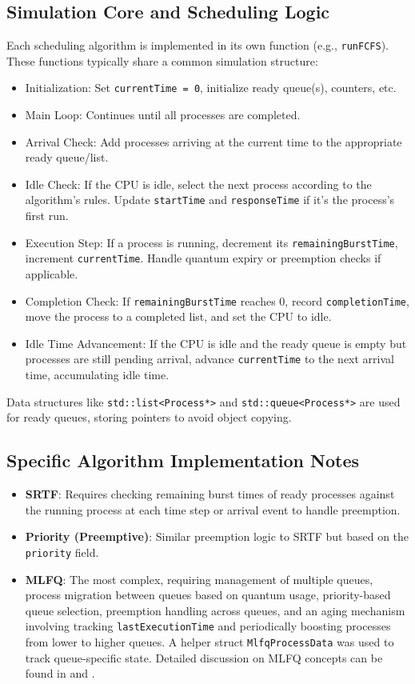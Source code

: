 \documentclass[12pt]{article}
\begin{document}
\subsection{Simulation Core and Scheduling Logic}
Each scheduling algorithm is implemented in its own function (e.g., \texttt{runFCFS}). These functions typically share a common simulation structure:
\begin{itemize}
    \item Initialization: Set \texttt{currentTime = 0}, initialize ready queue(s), counters, etc.
    \item Main Loop: Continues until all processes are completed.
    \item Arrival Check: Add processes arriving at the current time to the appropriate ready queue/list.
    \item Idle Check: If the CPU is idle, select the next process according to the algorithm's rules. Update \texttt{startTime} and \texttt{responseTime} if it's the process's first run.
    \item Execution Step: If a process is running, decrement its \texttt{remainingBurstTime}, increment \texttt{currentTime}. Handle quantum expiry or preemption checks if applicable.
    \item Completion Check: If \texttt{remainingBurstTime} reaches 0, record \texttt{completionTime}, move the process to a completed list, and set the CPU to idle.
    \item Idle Time Advancement: If the CPU is idle and the ready queue is empty but processes are still pending arrival, advance \texttt{currentTime} to the next arrival time, accumulating idle time.
\end{itemize}
Data structures like \texttt{std::list<Process*>} and \texttt{std::queue<Process*>} are used for ready queues, storing pointers to avoid object copying.

\subsection{Specific Algorithm Implementation Notes}
\begin{itemize}
    \item \textbf{SRTF}: Requires checking remaining burst times of ready processes against the running process at each time step or arrival event to handle preemption.
    \item \textbf{Priority (Preemptive)}: Similar preemption logic to SRTF but based on the \texttt{priority} field.
    \item \textbf{MLFQ}: The most complex, requiring management of multiple queues, process migration between queues based on quantum usage, priority-based queue selection, preemption handling across queues, and an aging mechanism involving tracking \texttt{lastExecutionTime} and periodically boosting processes from lower to higher queues. A helper struct \texttt{MlfqProcessData} was used to track queue-specific state. Detailed discussion on MLFQ concepts can be found in \citep{silberschatz2018operating} and  \citep{nauer}.
\end{itemize}
\end{document}
